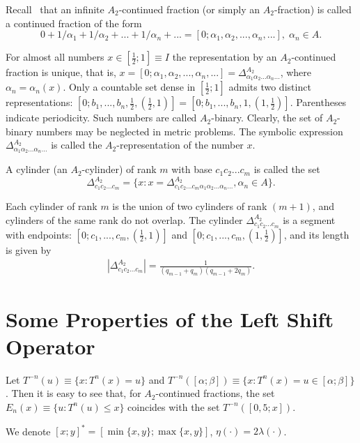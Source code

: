 \documentclass[11pt]{amsart}
\theoremstyle{plain}
\theoremstyle{remark}
\begin{document}
Recall~\cite{prats} that an infinite $A_2$-continued fraction (or simply an $A_2$-fraction) is called a continued fraction of the form
  $$0+1/\alpha_1+1/\alpha_2+...+1/\alpha_n+...=[0;\alpha_{1},\alpha_{2},...,\alpha_{n},...], \;\alpha_n\in A.$$

For almost all numbers $x\in[\frac{1}{2};1]\equiv I$ the representation by an $A_2$-continued fraction is unique, that is,
$x=[0;\alpha_1,\alpha_2,...,\alpha_n,...]=\Delta^{A_2}_{\alpha_1\alpha_2...\alpha_n...}$, where $\alpha_n=\alpha_n(x)$. Only a countable set dense in $[\frac{1}{2};1]$ admits two distinct representations:
$[0;b_{1}, ...,b_{n}, \frac{1}{2},(\frac{1}{2},1)]=[0;b_{1}, ...,b_{n}, 1,(1,\frac{1}{2})].$
Parentheses indicate periodicity. Such numbers are called $A_2$-binary. Clearly, the set of $A_2$-binary numbers may be neglected in metric problems. The symbolic expression $\Delta^{A_2}_{\alpha_1\alpha_2...\alpha_n...}$ is called the $A_2$-representation of the number $x$.

A cylinder (an $A_2$-cylinder) of rank $m$ with base  $c_1c_2...c_m$ is called the set
\[\Delta^{A_2}_{c_1c_2...c_m}=\{x: x=\Delta^{A_2}_{c_1c_2...c_m\alpha_1\alpha_2...\alpha_n...}, \alpha_n\in A\}.\]

Each cylinder of rank $m$ is the union of two cylinders of rank $(m+1)$, and cylinders of the same rank do not overlap.
The cylinder $\Delta^{A_2}_{c_1c_2...c_m}$  is a segment with endpoints: $[0;c_1,...,c_m,(\frac{1}{2},1)]$ and
$[0;c_1,...,c_m,(1,\frac{1}{2})]$, and its length is given by
\begin{eqnarray}
                       |{\Delta_{c_1c_2...c_m}^{A_2}}| = \frac{1}{(q_{m-1}+q_m)(q_{m-1}+2q_m)}.
            \end{eqnarray}
            
\section{Some Properties of the Left Shift Operator}

Let $T^{-n}(u)\equiv\{x: T^{n}(x)=u\}$ and $T^{-n}([\alpha;\beta])\equiv \{x: T^n(x)=u\in [\alpha;\beta]\}$.
Then it is easy to see that, for $A_2$-continued fractions, the set $E_n(x)\equiv \{u: T^n(u)\leq x\}$ coincides with the set $T^{-n}([0,5;x])$.


We denote  $[x;y]^{*}=[\min\{x,y\};\max\{x,y\}]$, $\eta(\cdot)=2\lambda(\cdot)$.
\end{document}
